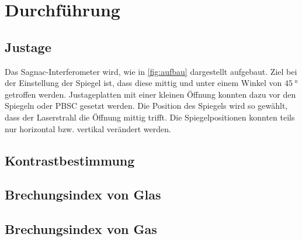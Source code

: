 \section{Durchführung}
\label{sec:Durchführung}

\subsection{Justage}
Das Sagnac-Interferometer wird, wie in \autoref{fig:aufbau} dargestellt aufgebaut.
Ziel bei der Einstellung der Spiegel ist, dass diese mittig und unter einem Winkel von $\qty{45}{\degree}$ getroffen werden.
Justageplatten mit einer kleinen Öffnung konnten dazu vor den Spiegeln oder PBSC gesetzt werden.
Die Position des Spiegels wird so gewählt, dass der Laserstrahl die Öffnung mittig trifft.
Die Spiegelpositionen konnten teils nur horizontal bzw. vertikal verändert werden.

\subsection{Kontrastbestimmung}

\subsection{Brechungsindex von Glas}

\subsection{Brechungsindex von Gas}
